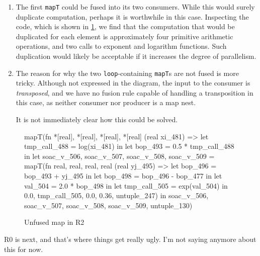 \begin{enumerate}
\item The first \texttt{mapT} could be fused into its two consumers.
  While this would surely duplicate computation, perhaps it is
  worthwhile in this case.  Inspecting the code, which is shown in
  \cref{fig:r2-unfused-map}, we find that the computation that would
  be duplicated for each element is approximately four primitive
  arithmetic operations, and two calls to exponent and logarithm
  functions.  Such duplication would likely be acceptable if it
  increases the degree of parallelism.

\item The reason for why the two \texttt{loop}-containing
  \texttt{mapT}s are not fused is more tricky.  Although not expressed
  in the diagram, the input to the consumer is \textit{transposed},
  and we have no fusion rule capable of handling a transposition in
  this case, as neither consumer nor producer is a map nest.

  It is not immediately clear how this could be solved.
\end{enumerate}

\begin{figure}
\begin{bcolorcode}
mapT(fn {*[real], *[real], *[real], *[real]} (real xi_481) =>
       let tmp_call_488 = log(xi_481) in
       let bop_493 = 0.5 * tmp_call_488 in
       let {soac_v_506, soac_v_507, soac_v_508, soac_v_509} =
         mapT(fn {real, real, real, real} (real yj_495) =>
                let bop_496 = bop_493 + yj_495 in
                let bop_498 = bop_496 - bop_477 in
                let val_504 = 2.0 * bop_498 in
                let tmp_call_505 = exp(val_504) in
                {0.0, tmp_call_505, 0.0, 0.36},
              untuple_247) in
       {soac_v_506, soac_v_507, soac_v_508, soac_v_509},
     untuple_130)
\end{bcolorcode}
\caption{Unfused map in R2}
\label{fig:r2-unfused-map}
\end{figure}

R0 is next, and that's where things get really ugly.  I'm not saying
anymore about this for now. 

